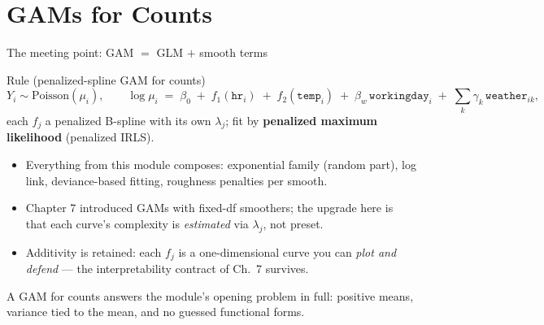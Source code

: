 \documentclass[aspectratio=169,11pt]{beamer}
\begin{document}
\section{GAMs for Counts}

\begin{frame}{The meeting point: GAM $=$ GLM $+$ smooth terms}
  \footnotesize
  \begin{block}{Rule (penalized-spline GAM for counts)}
    \[
      Y_i \sim \text{Poisson}(\mu_i), \qquad
      \log \mu_i \;=\; \beta_0 \;+\; f_1(\texttt{hr}_i) \;+\; f_2(\texttt{temp}_i)
      \;+\; \beta_w\,\texttt{workingday}_i \;+\; \textstyle\sum_k \gamma_k\, \texttt{weather}_{ik},
    \]
    each $f_j$ a penalized B-spline with its own $\lambda_j$; fit by
    \textbf{penalized maximum likelihood} (penalized IRLS).
  \end{block}
  \begin{readme}
    \begin{itemize}
      \item Everything from this module composes: exponential family (random part),
            log link, deviance-based fitting, roughness penalties per smooth.
      \item Chapter 7 introduced GAMs with fixed-df smoothers; the upgrade here is that
            each curve's complexity is \emph{estimated} via $\lambda_j$, not preset.
      \item Additivity is retained: each $f_j$ is a one-dimensional curve you can
            \emph{plot and defend} --- the interpretability contract of Ch.\ 7 survives.
    \end{itemize}
  \end{readme}
  \begin{takeaway}
    A GAM for counts answers the module's opening problem in full: positive means,
    variance tied to the mean, and no guessed functional forms.
  \end{takeaway}
\end{frame}
\end{document}
